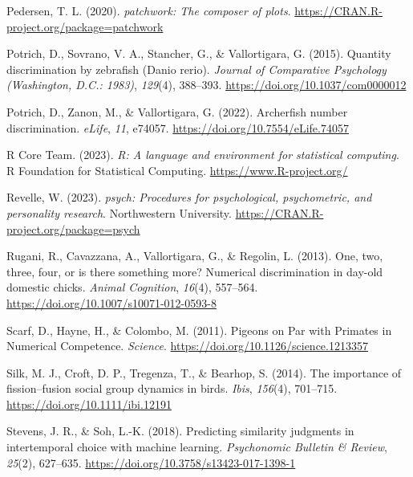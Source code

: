 \documentclass[
  ,pub,floatsintext]{apa6}
\newlength{\cslhangindent}
\newlength{\cslentryspacingunit} %
\newenvironment{CSLReferences}[2] %
 {%
  \setlength{\parindent}{0pt}
  \ifodd #1
  \let\oldpar\par
  \def\par{\hangindent=\cslhangindent\oldpar}
  \fi
  \setlength{\parskip}{#2\cslentryspacingunit}
 }%
 {}
\begin{document}
\begin{CSLReferences}{1}{0}
\leavevmode{}%
Pedersen, T. L. (2020). \emph{{patchwork}: The composer of plots}. \url{https://CRAN.R-project.org/package=patchwork}

\leavevmode{}%
Potrich, D., Sovrano, V. A., Stancher, G., \& Vallortigara, G. (2015). Quantity discrimination by zebrafish ({Danio} rerio). \emph{Journal of Comparative Psychology (Washington, D.C.: 1983)}, \emph{129}(4), 388--393. \url{https://doi.org/10.1037/com0000012}

\leavevmode{}%
Potrich, D., Zanon, M., \& Vallortigara, G. (2022). Archerfish number discrimination. \emph{eLife}, \emph{11}, e74057. \url{https://doi.org/10.7554/eLife.74057}

\leavevmode{}%
R Core Team. (2023). \emph{R: A language and environment for statistical computing}. R Foundation for Statistical Computing. \url{https://www.R-project.org/}

\leavevmode{}%
Revelle, W. (2023). \emph{{psych}: Procedures for psychological, psychometric, and personality research}. Northwestern University. \url{https://CRAN.R-project.org/package=psych}

\leavevmode{}%
Rugani, R., Cavazzana, A., Vallortigara, G., \& Regolin, L. (2013). One, two, three, four, or is there something more? {Numerical} discrimination in day-old domestic chicks. \emph{Animal Cognition}, \emph{16}(4), 557--564. \url{https://doi.org/10.1007/s10071-012-0593-8}

\leavevmode{}%
Scarf, D., Hayne, H., \& Colombo, M. (2011). Pigeons on {Par} with {Primates} in {Numerical Competence}. \emph{Science}. \url{https://doi.org/10.1126/science.1213357}

\leavevmode{}%
Silk, M. J., Croft, D. P., Tregenza, T., \& Bearhop, S. (2014). The importance of fission--fusion social group dynamics in birds. \emph{Ibis}, \emph{156}(4), 701--715. \url{https://doi.org/10.1111/ibi.12191}

\leavevmode{}%
Stevens, J. R., \& Soh, L.-K. (2018). Predicting similarity judgments in intertemporal choice with machine learning. \emph{Psychonomic Bulletin \& Review}, \emph{25}(2), 627--635. \url{https://doi.org/10.3758/s13423-017-1398-1}


\end{CSLReferences}
\end{document}
